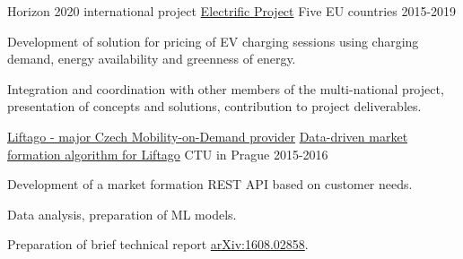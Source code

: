\begin{cventries}
  \cventry
    {Horizon 2020 international project} %
    {\href{https://electrific-project.eu/}{Electrific Project}} %
    {Five EU countries} %
    {2015-2019} %
    {
      \begin{cvitems} %
        \item {Development of solution for pricing of EV charging sessions using charging demand, energy availability and greenness of energy.}
        \item {Integration and coordination with other members of the multi-national project, presentation of concepts and solutions, contribution to project deliverables.}
      \end{cvitems}
    }

  \cventry
    {\href{https://www.liftago.com/}{Liftago - major Czech Mobility-on-Demand provider}} %
    {\href{https://cw.fel.cvut.cz/b221/courses/b4b33rph/start}{Data-driven market formation algorithm for Liftago}} %
    {CTU in Prague} %
    {2015-2016} %
    {
      \begin{cvitems} %
        \item {Development of a market formation REST API based on customer needs.}
        \item {Data analysis, preparation of ML models.}
        \item {Preparation of brief technical report \href{https://arxiv.org/abs/1608.02858}{arXiv:1608.02858}.}
      \end{cvitems}
    }

\end{cventries}
    




